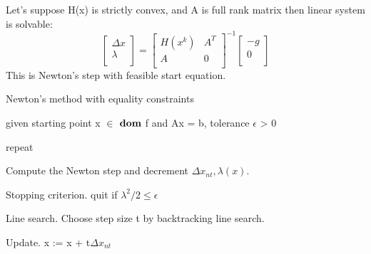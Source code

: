 \documentclass[fleqn]{article}
\begin{document}
Let's suppose H(x) is strictly convex, and A is full rank matrix then linear system is solvable:
\[
\begin{bmatrix}
    \Delta x        \\
    \lambda       \\
\end{bmatrix}
=
\begin{bmatrix}
    H(x^k)       & A^T \\
    A       & 0 \\
\end{bmatrix}^{-1}
\begin{bmatrix}
    -g\\
    0\\
\end{bmatrix}
\]
This is Newton's step with feasible start equation.

\begin{algorithm}
\caption{Newton's method with equality constraints}
\begin{algorithmic}[1]
    \State given starting point x $\in$ $\bf{dom}$ f and Ax = b, tolerance $\epsilon$ > 0
    
    \State repeat 
    
    \State Compute the Newton step and decrement $\Delta x_{nt}, \lambda(x) $.
    
    \State Stopping criterion. quit if $\lambda^2/2 \le \epsilon$
    
    \State Line search. Choose step size t by backtracking line search.
    
    \State Update. x := x + t$\Delta x_{nt} $
\end{algorithmic}
\end{algorithm}
\end{document}
